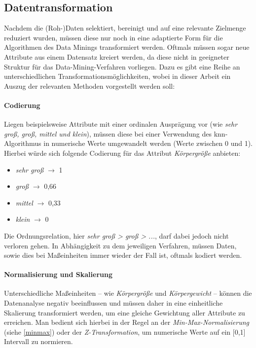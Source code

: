 \subsection{Datentransformation}
\label{dt}
Nachdem die (Roh-)Daten selektiert, bereinigt und auf eine relevante Zielmenge reduziert wurden, müssen diese nur noch in eine adaptierte Form für die Algorithmen des Data Minings transformiert werden. Oftmals müssen sogar neue Attribute aus einem Datensatz kreiert werden, da diese nicht in geeigneter Struktur für das Data-Mining-Verfahren vorliegen. Dazu es gibt eine Reihe an unterschiedlichen Transformationsmöglichkeiten, wobei in dieser Arbeit ein Auszug der relevanten Methoden vorgestellt werden soll:

\paragraph{Codierung}
Liegen beispielsweise Attribute mit einer ordinalen Ausprägung vor (wie \textit{sehr groß, groß, mittel und klein}), müssen diese bei einer Verwendung des \gls{knn}-Algorithmus in numerische Werte umgewandelt werden (Werte zwischen 0 und 1). Hierbei würde sich folgende Codierung für das Attribut \textit{Körpergröße} anbieten:

\begin{itemize}
\item \textit{sehr groß} $\rightarrow$ 1
\item \textit{groß} $\rightarrow$ 0,66
\item \textit{mittel} $\rightarrow$ 0,33
\item \textit{klein} $\rightarrow$ 0
\end{itemize}

Die Ordnungsrelation, hier \textit{sehr groß > groß > ...}, darf dabei jedoch nicht verloren gehen. In Abhängigkeit zu dem jeweiligen Verfahren, müssen Daten, sowie dies bei Maßeinheiten immer wieder der Fall ist, oftmals kodiert werden.

\paragraph{Normalisierung und Skalierung}
Unterschiedliche Maßeinheiten -- wie \textit{Körpergröße} und \textit{Körpergewicht} -- können die Datenanalyse negativ beeinflussen und müssen daher in eine einheitliche Skalierung transformiert werden, um eine gleiche Gewichtung aller Attribute zu erreichen. Man bedient sich hierbei in der Regel an der \textit{Min-Max-Normalisierung} (siehe \vref{minmax}) oder der \textit{Z-Transformation}, um numerische Werte auf ein [0,1] Intervall zu normieren.

